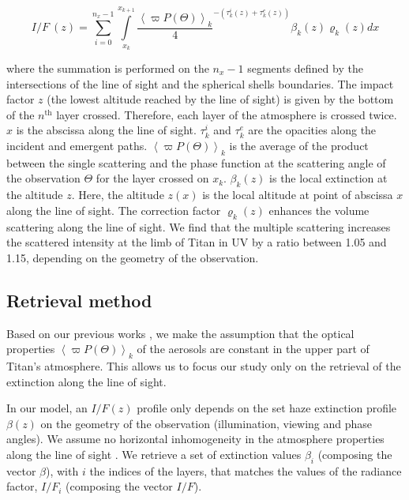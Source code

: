 \begin{equation}
I/F\ (z) = \sum_{i=0}^{n_x-1} \int\limits_{x_k}^{x_{k+1}}
\frac{\left< \varpi P(\Theta) \right>_k} {4}
^{-\left( \tau^i_k\left(z\right) + \tau^e_k\left(z\right) \right)}
\beta_k\left(z\right) \varrho_k\left(z\right) d{x}
\label{eq:west2017_sup_limb}
\end{equation}

where the summation is performed on the $n_x-1$ segments defined by the intersections of the line of sight and the
spherical shells boundaries. The impact factor $z$ (the lowest altitude reached by the line of sight) is given by the
bottom of the $n^\mathrm{th}$ layer crossed. Therefore, each layer of the atmosphere is crossed twice. $x$ is the
abscissa along the line of sight. $\tau^i_k$ and $\tau^e_k$ are the opacities along the incident and emergent paths.
$\left< \varpi P(\Theta)\right>_k$ is the average of the product between the single scattering and the phase function
at the scattering angle of the observation $\Theta$ for the layer crossed on $x_k$.  $\beta_k(z)$ is the local
extinction at the altitude $z$. Here, the altitude $z(x)$ is the local altitude at point of abscissa $x$ along the
line of sight. The correction factor $\varrho_k\left(z\right)$ enhances the volume scattering along the line of sight.
We find that the multiple scattering increases the scattered intensity at the limb of Titan in UV by a ratio between
1.05 and 1.15, depending on the geometry of the observation.


\subsection{Retrieval method}

Based on our previous works \citep{Seignovert2017, West2018}, we make the assumption that the optical properties
$\left<\varpi P(\Theta)\right>_k$ of the aerosols are constant in the upper part of Titan's atmosphere. This allows
us to focus our study only on the retrieval of the extinction along the line of sight.

In our model, an $I/F(z)$ profile only depends on the set haze extinction profile $\beta(z)$ on the geometry of
the observation (illumination, viewing and phase angles). We assume no horizontal inhomogeneity in the atmosphere
properties along the line of sight \citep{Seignovert2017}. We retrieve a set of extinction values $\beta_i$ (composing
the vector ${\beta}$), with $i$ the indices of the layers, that matches the values of the radiance factor, $I/F_i$
(composing the vector $I/F$).

